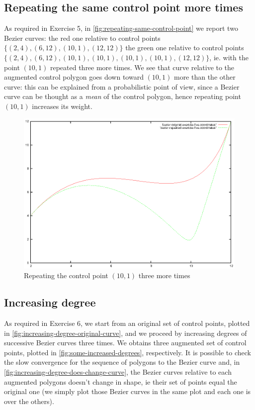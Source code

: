 \documentclass{article}
\begin{document}
\subsection{Repeating the same control point more times}
As required in Exercise 5, in
\autoref{fig:repeating-same-control-point} we report two Bezier curves: the
red one relative to control points $\{(2,4), (6,12), (10,1),
(12,12)\}$ the green one relative to control points $\{(2,4), (6,12),
(10,1), (10,1), (10,1), (10,1), (12,12)\}$, ie. with the point
$(10,1)$ repeated three more times. We see that curve relative to
the augmented control polygon goes down toward $(10,1)$ more than the
other curve: this can be explained from a probabilistic point of
view, since a Bezier curve can be thought as a \emph{mean} of the control
polygon, hence repeating point $(10,1)$ increases its weight.

\begin{figure}[h!]
  \centering
  \includegraphics{bezier-deCasteljau-curves/exercise-five}
  \caption{Repeating the control point $(10,1)$ three more times}
  \label{fig:repeating-same-control-point}
\end{figure}

\subsection{Increasing degree}
As required in Exercise 6, we start from an original set of control
points, plotted in \autoref{fig:increasing-degree-original-curve}, and
we proceed by increasing degrees of successive Bezier curves three times.
We obtains three augmented set of control points, plotted in
\autoref{fig:some-increased-degrees}, respectively. It is possible to
check the slow convergence for the sequence of polygons to the Bezier
curve and, in \autoref{fig:increasing-degree-does-change-curve}, the
Bezier curves relative to each augmented polygons doesn't change in
shape, ie their set of points equal the original one (we simply plot
those Bezier curves in the same plot and each one is over the others).
\end{document}
